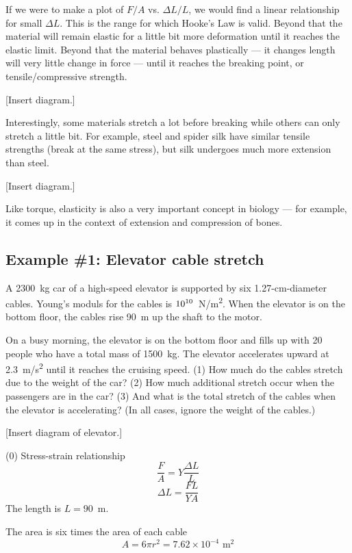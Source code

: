 If we were to make a plot of $F/A$ vs. $\Delta{L}/L$, we would find a linear relationship for small $\Delta{L}$. This is the range for which Hooke's Law is valid. Beyond that the material will remain elastic for a little bit more deformation until it reaches the elastic limit. Beyond that the material behaves plastically --- it changes length will very little change in force --- until it reaches the breaking point, or tensile/compressive strength.

[Insert diagram.]
\vspace{5cm}

Interestingly, some materials stretch a lot before breaking while others can only stretch a little bit. For example, steel and spider silk have similar tensile strengths (break at the same stress), but silk undergoes much more extension than steel.

[Insert diagram.]
\vspace{5cm}

Like torque, elasticity is also a very important concept in biology --- for example, it comes up in the context of extension and compression of bones.

\subsection{Example \#1: Elevator cable stretch}
A 2300~kg car of a high-speed elevator is supported by six 1.27-cm-diameter cables. Young's moduls for the cables is $10\time10^{10}$~N/m\textsuperscript{2}. When the elevator is on the bottom floor, the cables rise 90~m up the shaft to the motor.

On a busy morning, the elevator is on the bottom floor and fills up with 20 people who have a total mass of 1500~kg. The elevator accelerates upward at 2.3~m/s\textsuperscript{2} until it reaches the cruising speed. (1) How much do the cables stretch due to the weight of the car? (2) How much additional stretch occur when the passengers are in the car? (3) And what is the total stretch of the cables when the elevator is accelerating? (In all cases, ignore the weight of the cables.)

[Insert diagram of elevator.]
\vspace{4cm}

(0) Stress-strain relationship
$$\frac{F}{A} = Y\frac{\Delta L}{L}$$
$$\Delta L = \frac{FL}{YA}$$
The length is $L=90$~m.

The area is six times the area of each cable
$$A = 6\pi r^2 = 7.62\times 10^{-4}\mbox{ m}^2$$

